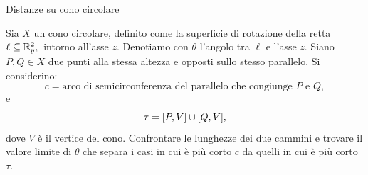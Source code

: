 \documentclass[a4paper]{article}
\begin{document}
\begin{snippetexercise}{Distanze su cono circolare}
    \begin{figure}
        \centering
    \end{figure}
    Sia \(X\) un cono circolare, definito come la superficie di
    rotazione della retta \(\ell\subseteq\mathbb{R}^2_{yz}\) intorno
    all'asse \(z\). Denotiamo con \(\theta\) l'angolo tra \(\ell\) e
    l'asse \(z\).
    Siano \(P,Q\in X\) due punti alla stessa altezza e opposti sullo
    stesso parallelo. Si considerino:
    \[
        c = \text{arco di semicirconferenza del parallelo che congiunge } P
        \text{ e } Q,
    \]
    e
    \[
        \tau=[P,V]\cup[Q,V],
    \]
    dove \(V\) è il vertice del cono.
    Confrontare le lunghezze dei due cammini e trovare il valore limite
    di \(\theta\) che separa i casi in cui è più corto \(c\) da quelli in
    cui è più corto \(\tau\). \wrapfill
\end{snippetexercise}
\end{document}
